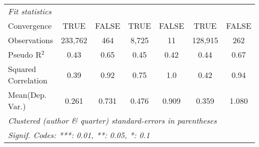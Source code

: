 \begin{tabular}{lcccccc}
   \midrule
   \emph{Fit statistics}\\
   Convergence                                                &TRUE           & FALSE         & TRUE          & FALSE & TRUE           & FALSE\\  
   Observations                                               & 233,762       & 464           & 8,725         & 11    & 128,915        & 262\\  
   Pseudo R$^2$                                               & 0.43          & 0.65          & 0.45          & 0.42  & 0.44           & 0.67\\  
   Squared Correlation                                        & 0.39          & 0.92          & 0.75          & 1.0   & 0.42           & 0.94\\  
Mean(Dep. Var.) & 0.261 & 0.731 & 0.476 & 0.909 & 0.359 & 1.080 \\
   \midrule \midrule
   \multicolumn{7}{l}{\emph{Clustered (author \& quarter) standard-errors in parentheses}}\\
   \multicolumn{7}{l}{\emph{Signif. Codes: ***: 0.01, **: 0.05, *: 0.1}}\\
\end{tabular}
\par\endgroup

